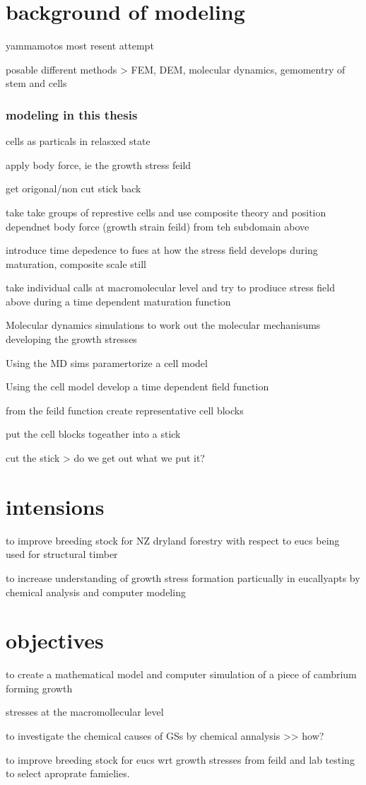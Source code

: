 \documentclass{article}
\begin{document}
\section{background of modeling}

yammamotos most resent attempt

posable different methods > FEM, DEM, molecular dynamics, gemomentry of stem and cells

\subsubsection{modeling in this thesis}
cells as particals in relasxed state

apply body force, ie the growth stress feild

get origonal/non cut stick back

take take groups of represtive cells and use composite theory and position dependnet body force (growth strain feild) from teh subdomain above

introduce time depedence to fues at how the stress field develops during maturation, composite scale still

take individual calls at macromolecular level and try to prodiuce stress field above during a time dependent maturation function

Molecular dynamics simulations to work out the molecular mechanisums developing the growth stresses

Using the MD sims paramertorize a cell model

Using the cell model develop a time dependent field function

from the feild function create representative cell blocks

put the cell blocks togeather into a stick

cut the stick > do we get out what we put it?

\section{intensions}
to improve breeding stock for NZ dryland forestry with respect to eucs being used for structural timber

to increase understanding of growth stress formation particually in eucallyapts by chemical analysis and computer modeling

\section{objectives}

to create a mathematical model and computer simulation of a piece of cambrium forming growth

stresses at the macromollecular level

to investigate the chemical causes of GSs by chemical annalysis >> how?

to improve breeding stock for eucs wrt growth stresses from feild and lab testing to select aproprate famielies.
\end{document}
